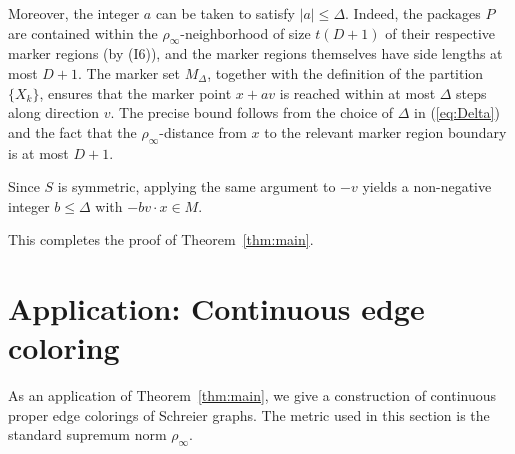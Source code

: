 \documentclass{amsart}
\theoremstyle{definition}
\begin{document}
Moreover, the integer $a$ can be taken to satisfy $|a|\leq \Delta$.
Indeed, the packages $P$ are contained within the $\rho_\infty$-neighborhood
of size $t(D+1)$ of their respective marker regions (by (I6)), and the
marker regions themselves have side lengths at most $D+1$. The marker set
$M_\Delta$, together with the definition of the partition $\{X_k\}$,
ensures that the marker point $x+av$ is reached within at most $\Delta$
steps along direction $v$. The precise bound follows from the choice of
$\Delta$ in (\ref{eq:Delta}) and the fact that the $\rho_\infty$-distance
from $x$ to the relevant marker region boundary is at most $D+1$.

Since $S$ is symmetric, applying the same argument to $-v$ yields a
non-negative integer $b\leq\Delta$ with $-bv\cdot x\in M$.

This completes the proof of Theorem~\ref{thm:main}.

\section{Application: Continuous edge coloring}\label{sec:app}

As an application of Theorem~\ref{thm:main}, we give a construction of
continuous proper edge colorings of Schreier graphs. The metric used in
this section is the standard supremum norm $\rho_\infty$.
\end{document}
